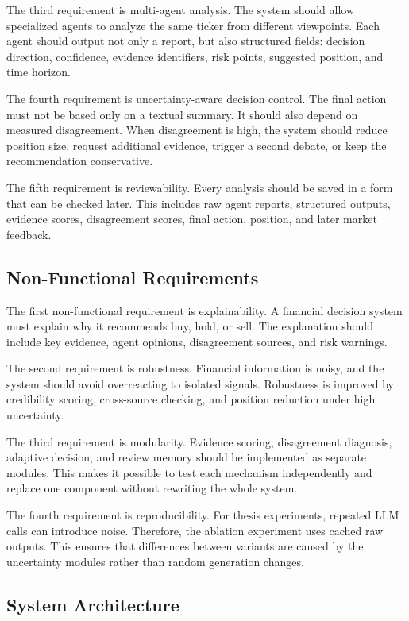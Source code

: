\documentclass[14pt,a4paper]{extarticle}
\begin{document}
The third requirement is multi-agent analysis. The system should allow specialized agents to analyze the same ticker from different viewpoints. Each agent should output not only a report, but also structured fields: decision direction, confidence, evidence identifiers, risk points, suggested position, and time horizon.

The fourth requirement is uncertainty-aware decision control. The final action must not be based only on a textual summary. It should also depend on measured disagreement. When disagreement is high, the system should reduce position size, request additional evidence, trigger a second debate, or keep the recommendation conservative.

The fifth requirement is reviewability. Every analysis should be saved in a form that can be checked later. This includes raw agent reports, structured outputs, evidence scores, disagreement scores, final action, position, and later market feedback.

\subsection{Non-Functional Requirements}

The first non-functional requirement is explainability. A financial decision system must explain why it recommends buy, hold, or sell. The explanation should include key evidence, agent opinions, disagreement sources, and risk warnings.

The second requirement is robustness. Financial information is noisy, and the system should avoid overreacting to isolated signals. Robustness is improved by credibility scoring, cross-source checking, and position reduction under high uncertainty.

The third requirement is modularity. Evidence scoring, disagreement diagnosis, adaptive decision, and review memory should be implemented as separate modules. This makes it possible to test each mechanism independently and replace one component without rewriting the whole system.

The fourth requirement is reproducibility. For thesis experiments, repeated LLM calls can introduce noise. Therefore, the ablation experiment uses cached raw outputs. This ensures that differences between variants are caused by the uncertainty modules rather than random generation changes.

\subsection{System Architecture}
\end{document}
